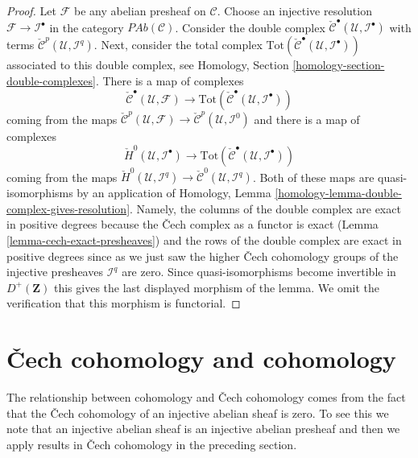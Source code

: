 \begin{proof}
\medskip\noindent
Let $\mathcal{F}$ be any abelian presheaf on $\mathcal{C}$.
Choose an injective resolution $\mathcal{F} \to \mathcal{I}^\bullet$
in the category $\textit{PAb}(\mathcal{C})$.
Consider the double complex
$\check{\mathcal{C}}^\bullet(\mathcal{U}, \mathcal{I}^\bullet)$
with terms $\check{\mathcal{C}}^p(\mathcal{U}, \mathcal{I}^q)$.
Next, consider the total complex
$\text{Tot}(\check{\mathcal{C}}^\bullet(\mathcal{U}, \mathcal{I}^\bullet))$
associated to this double complex, see
Homology, Section \ref{homology-section-double-complexes}.
There is a map of complexes
$$
\check{\mathcal{C}}^\bullet(\mathcal{U}, \mathcal{F})
\longrightarrow
\text{Tot}(\check{\mathcal{C}}^\bullet(\mathcal{U}, \mathcal{I}^\bullet))
$$
coming from the maps
$\check{\mathcal{C}}^p(\mathcal{U}, \mathcal{F})
\to \check{\mathcal{C}}^p(\mathcal{U}, \mathcal{I}^0)$
and there is a map of complexes
$$
\check{H}^0(\mathcal{U}, \mathcal{I}^\bullet)
\longrightarrow
\text{Tot}(\check{\mathcal{C}}^\bullet(\mathcal{U}, \mathcal{I}^\bullet))
$$
coming from the maps
$\check{H}^0(\mathcal{U}, \mathcal{I}^q) \to
\check{\mathcal{C}}^0(\mathcal{U}, \mathcal{I}^q)$.
Both of these maps are quasi-isomorphisms by an application of
Homology, Lemma \ref{homology-lemma-double-complex-gives-resolution}.
Namely, the columns of the double complex are exact in positive degrees
because the {\v C}ech complex as a functor is exact
(Lemma \ref{lemma-cech-exact-presheaves})
and the rows of the double complex are exact in positive degrees
since as we just saw the higher {\v C}ech cohomology groups of the injective
presheaves $\mathcal{I}^q$ are zero.
Since quasi-isomorphisms become invertible
in $D^{+}(\mathbf{Z})$ this gives the last displayed morphism
of the lemma. We omit the verification that this morphism is
functorial.
\end{proof}





\section{{\v C}ech cohomology and cohomology}
\label{section-cech-cohomology-cohomology}

\noindent
The relationship between cohomology and {\v C}ech cohomology comes from the fact
that the {\v C}ech cohomology of an injective abelian sheaf is zero. To see this
we note that an injective abelian sheaf is an injective abelian presheaf and
then we apply results in {\v C}ech cohomology in the preceding section.


